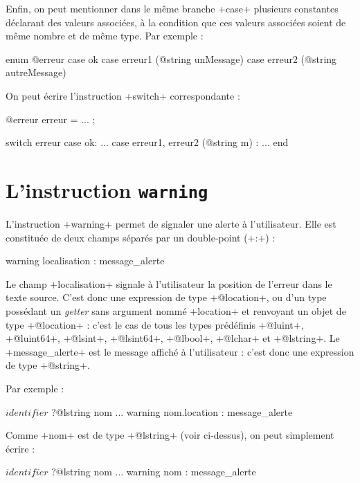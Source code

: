 Enfin, on peut mentionner dans le même branche \ggs+case+ plusieurs constantes déclarant des valeurs associées, à la condition que ces valeurs associées soient de même nombre et de même type. Par exemple :

\begin{galgas}
enum @erreur {
  case ok
  case erreur1 (@string unMessage)
  case erreur2 (@string autreMessage) 
}
\end{galgas}

On peut écrire l'instruction \ggs+switch+ correspondante :
\begin{galgas}
@erreur erreur = ... ;

switch erreur
case ok:
  ...
case erreur1, erreur2 (@string m) :
  ...
end
\end{galgas}




\section{L'instruction \texttt{warning}}

L'instruction \ggs+warning+ permet de signaler une alerte à l'utilisateur. Elle est constituée de deux champs séparés par un double-point (\ggs+:+) :

\begin{galgas}
warning localisation : message_alerte
\end{galgas}



Le champ \ggs+localisation+ signale à l'utilisateur la position de l'erreur dans le texte source. C'est donc une expression de type \ggs+@location+, ou d'un type possédant un \emph{getter} sans argument nommé \ggs+location+ et renvoyant un objet de type \ggs+@location+ : c'est le cas de tous les types prédéfinis \ggs+@luint+, \ggs+@luint64+, \ggs+@lsint+, \ggs+@lsint64+, \ggs+@lbool+, \ggs+@lchar+ et \ggs+@lstring+. Le \ggs+message_alerte+ est le message affiché à l'utilisateur : c'est donc une expression de type \ggs+@string+.

Par exemple :

\begin{galgas}
$identifier$ ?@lstring nom
...
warning nom.location : message_alerte
\end{galgas}

Comme \ggs+nom+ est de type \ggs+@lstring+ (voir ci-dessus), on peut simplement écrire :
\begin{galgas}
$identifier$ ?@lstring nom
...
warning nom : message_alerte
\end{galgas}










